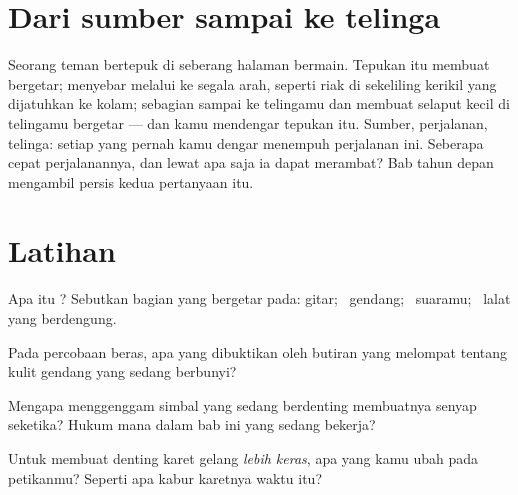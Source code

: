 \section{Dari sumber sampai ke telinga}

\begin{example}\label{ex:g3:sound-around-us:journey}
Seorang teman bertepuk di seberang halaman bermain. Tepukan itu
membuat  bergetar;  menyebar melalui  ke segala
arah, seperti riak di sekeliling kerikil yang dijatuhkan ke kolam;
sebagian  sampai ke telingamu dan membuat selaput kecil di
telingamu bergetar --- dan kamu mendengar tepukan itu. Sumber,
perjalanan, telinga: setiap  yang pernah kamu dengar menempuh
perjalanan ini. Seberapa cepat perjalanannya, dan lewat apa saja ia
dapat merambat? Bab  tahun depan mengambil persis kedua
pertanyaan itu.
\end{example}

\section{Latihan}

\begin{exercise}[$\star$]\label{exo:g3:sound-around-us:1}
Apa itu ? Sebutkan bagian yang bergetar pada: gitar; \ gendang;
\ suaramu; \ lalat yang berdengung.
\end{exercise}

\begin{exercise}[$\star$]\label{exo:g3:sound-around-us:2}
Pada percobaan beras, apa yang dibuktikan oleh butiran yang melompat
tentang kulit gendang yang sedang berbunyi?
\end{exercise}

\begin{exercise}[$\star$]\label{exo:g3:sound-around-us:3}
Mengapa menggenggam simbal yang sedang berdenting membuatnya senyap
seketika? Hukum mana dalam bab ini yang sedang bekerja?
\end{exercise}

\begin{exercise}[$\star$]\label{exo:g3:sound-around-us:4}
Untuk membuat denting karet gelang \emph{lebih keras}, apa yang kamu
ubah pada petikanmu? Seperti apa kabur karetnya waktu itu?
\end{exercise}

